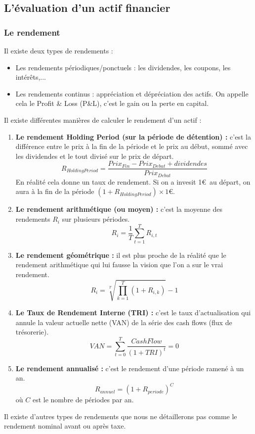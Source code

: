\subsection{L'évaluation d'un actif financier}

\subsubsection{Le rendement}
Il existe deux types de rendements :
\begin{itemize}
 \item Les rendements périodiques/ponctuels : les dividendes, les coupons, les intérêts,...
 \item Les rendements continus : appréciation et dépréciation des actifs. On appelle cela le Profit \& Loss (P\&L), c'est le gain ou la perte en capital.
\end{itemize}

Il existe différentes manières de calculer le rendement d'un actif :
\begin{enumerate}
 \item \textbf{Le rendement Holding Period (sur la période de détention) :} c'est la différence entre le prix à la fin de la période et le prix au début, sommé avec les dividendes et le tout divisé sur le prix de départ.
 \[ R_{Holding Period} = \frac{Prix_{Fin}-Prix_{Debut}+dividendes}{Prix_{Debut}} \]
 En réalité cela donne un taux de rendement. Si on a invesit 1\euro\ au départ, on aura à la fin de la période \((1 + R_{Holding Period})\times 1\)\euro.
 \item \textbf{Le rendement arithmétique (ou moyen) :} c'est la moyenne des rendements $R_i$ sur plusieurs périodes.
 \[ R_{i} = \frac{1}{T} \sum_{t=1}^T R_{i,t}\]
 \item \textbf{Le rendement géométrique :} il est plus proche de la réalité que le rendement arithmétique qui lui fausse la vision que l'on a sur le vrai rendement.
 \[ R_{i} = \sqrt[T]{\prod_{k=1}^{T}(1+R_{i,k})}-1\]
 \item \textbf{Le Taux de Rendement Interne (TRI) :} c'est le taux d'actualisation qui annule la valeur actuelle nette (VAN) de la série des cash flows (flux de trésorerie).
 \[ VAN = \sum_{t=0}^{T} \frac{CashFlow}{(1+TRI)^t} = 0\]
 \item \textbf{Le rendement annualisé :} c'est le rendement d'une période ramené à un an.
 \[ R_{annuel} = (1+R_{periode})^C\]
 où $C$ est le nombre de périodes par an.
\end{enumerate}
Il existe d'autres types de rendements que nous ne détaillerons pas comme le rendement nominal avant ou après taxe.\\

